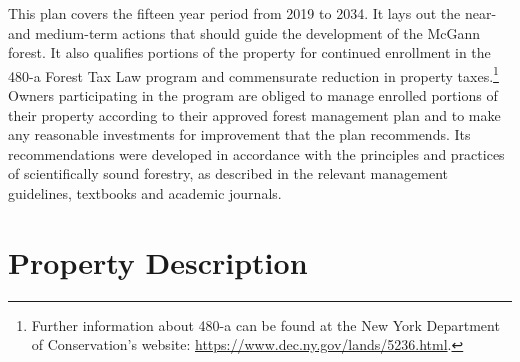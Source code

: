 \documentclass[]{tufte-handout}
\begin{document}
This plan covers the fifteen year period from 2019 to 2034. It lays out
the near- and medium-term actions that should guide the development of
the McGann forest. It also qualifies portions of the property for
continued enrollment in the 480-a Forest Tax Law program and
commensurate reduction in property taxes.\footnote{Further information
  about 480-a can be found at the New York Department of Conservation's
  website: \url{https://www.dec.ny.gov/lands/5236.html}. \vspace{20pt}}
Owners participating in the program are obliged to manage enrolled
portions of their property according to their approved forest management
plan and to make any reasonable investments for improvement that the
plan recommends. Its recommendations were developed in accordance with
the principles and practices of scientifically sound forestry, as
described in the relevant management guidelines, textbooks and academic
journals.

\section{Property Description}\label{property-description}
\end{document}
